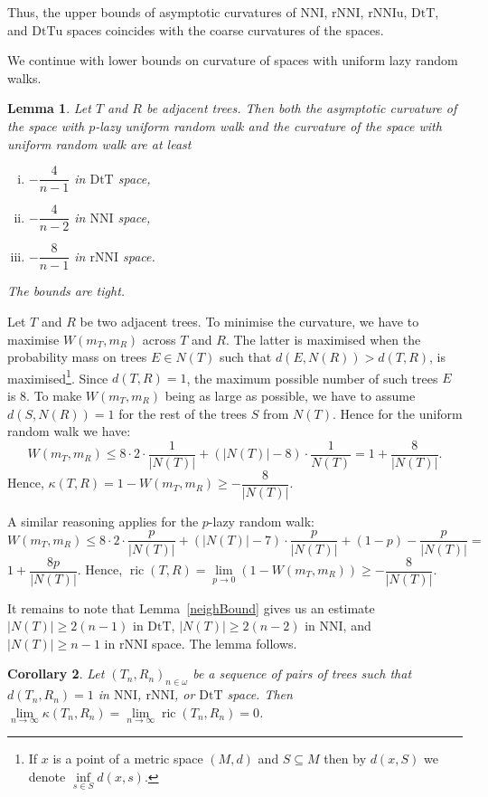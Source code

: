 \documentclass{amsart}
\newtheorem{lemma}{Lemma}
\newtheorem{corollary}[lemma]{Corollary}
\newcommand{\nni}{\mathrm{NNI}}
\newcommand{\rnni}{\mathrm{rNNI}}
\newcommand{\rnniu}{\mathrm{rNNIu}}
\newcommand{\mdts}{\mathrm{DtT}}
\newcommand{\mdtsu}{\mathrm{DtTu}}
\newcommand{\ric}{\operatorname{ric}}
\begin{document}
Thus, the upper bounds of asymptotic curvatures of $\nni$, $\rnni$, $\rnniu$, $\mdts$, and $\mdtsu$ spaces coincides with the coarse curvatures of the spaces.

We continue with lower bounds on curvature of spaces with uniform lazy random walks.

\begin{lemma}\label{uniformLower}
Let $T$ and $R$ be adjacent trees.
Then both the asymptotic curvature of the space with $p$-lazy uniform random walk and the curvature of the space with uniform random walk are at least
\begin{enumerate}[(i)]
\item $-\dfrac{4}{n-1}$ in $\mdts$ space,
\item $-\dfrac{4}{n-2}$ in $\nni$ space,
\item $-\dfrac{8}{n-1}$ in $\rnni$ space.
\end{enumerate}

The bounds are tight.
\end{lemma}

\proof
Let $T$ and $R$ be two adjacent trees.
To minimise the curvature, we have to maximise $W(m_T, m_R)$ across $T$ and $R$.
The latter is maximised when the probability mass on trees $E\in N(T)$ such that $d(E, N(R)) > d(T, R)$, is
maximised\footnote{If $x$ is a point of a metric space $(M,d)$ and $S \subseteq M$ then by $d(x,S)$ we denote $\inf\limits_{s \in S} d(x,s)$.}.
Since $d(T, R) = 1$, the maximum possible number of such trees $E$ is
$8$.
To make $W(m_T,m_R)$ being as large as possible, we have to assume $d(S, N(R)) = 1$ for the rest of the trees $S$ from $N(T)$.
Hence for the uniform random walk we have:
\[
W(m_T,m_R)\leq 8 \cdot 2 \cdot \frac{1}{|N(T)|} +
(|N(T)| - 8) \cdot \frac{1}{N(T)} = 1 + \dfrac{8}{|N(T)|}.
\]
Hence, $\kappa(T,R) = 1 - W(m_T,m_R) \geq - \dfrac{8}{|N(T)|}$.

A similar reasoning applies for the $p$-lazy random walk:
\[
W(m_T,m_R)\leq 8 \cdot 2 \cdot \frac{p}{|N(T)|} +
(|N(T)| - 7) \cdot \frac{p}{|N(T)|} + (1-p) - \frac{p}{|N(T)|} =
\]
$1 + \dfrac{8p}{|N(T)|}$.
Hence, $\ric(T,R) = \lim\limits_{p\to0}\left(1 - W(m_T,m_R)\right) \geq - \dfrac{8}{|N(T)|}$.

It remains to note that Lemma~\ref{neighBound} gives us an estimate $|N(T)| \geq 2(n-1)$ in $\mdts$, $|N(T)| \geq 2(n-2)$ in $\nni$, and $|N(T)| \geq n-1$ in $\rnni$ space.
The lemma follows.
\endproof

\begin{corollary}\label{flatInLimDTS}
Let $(T_n,R_n)_{n\in\omega}$ be a sequence of pairs of trees such that $d(T_n,R_n) = 1$ in $\nni$, $\rnni$, or $\mdts$ space.
Then $\lim\limits_{n \to \infty}\kappa(T_n,R_n) = \lim\limits_{n \to \infty}\ric(T_n,R_n) = 0$.
\end{corollary}
\end{document}
